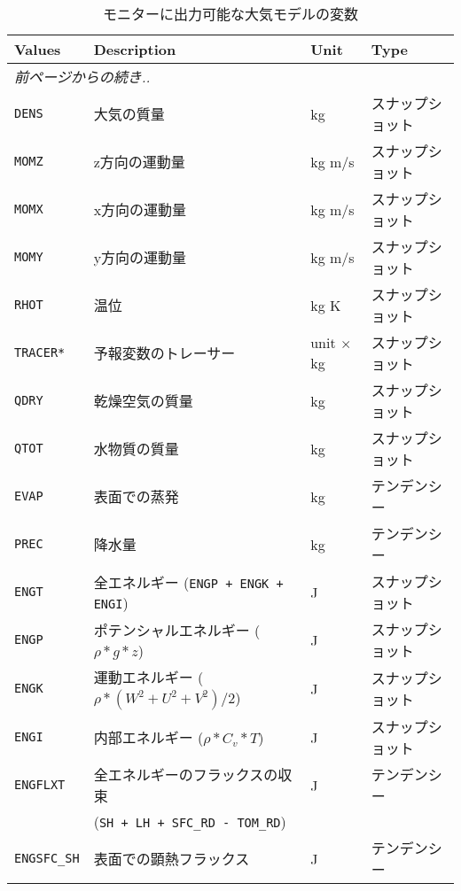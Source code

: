 \begin{longtable}{|l|l|l|l|}
  \caption{モニターに出力可能な大気モデルの変数}
  \label{tab:varlist_monitor_atmos} \\ \hline
  \rowcolor[gray]{0.9}  Values & Description & Unit & Type \\ \hline
  \endfirsthead
  \multicolumn{4}{l}{\small\it 前ページからの続き..} \\ \hline
  \endhead
  \hline
  \endfoot
      \verb|DENS|         & 大気の質量                      & kg     & スナップショット \\
      \verb|MOMZ|         & z方向の運動量                   & kg m/s & スナップショット \\
      \verb|MOMX|         & x方向の運動量                   & kg m/s & スナップショット \\
      \verb|MOMY|         & y方向の運動量                   & kg m/s & スナップショット \\
      \verb|RHOT|         & 温位                           & kg K   & スナップショット \\
      \verb|TRACER*|      & 予報変数のトレーサー             & unit $\times$ kg & スナップショット \\
      \verb|QDRY|         & 乾燥空気の質量                  & kg & スナップショット \\
      \verb|QTOT|         & 水物質の質量                    & kg & スナップショット \\
      \verb|EVAP|         & 表面での蒸発                    & kg & テンデンシー \\
      \verb|PREC|         & 降水量                         & kg & テンデンシー \\
      \verb|ENGT|         & 全エネルギー (\verb|ENGP + ENGK + ENGI|)   & J & スナップショット \\
      \verb|ENGP|         & ポテンシャルエネルギー ($\rho * g * z$)     & J & スナップショット \\
      \verb|ENGK|         & 運動エネルギー ($\rho * (W^2+U^2+V^2) / 2$) & J & スナップショット \\
      \verb|ENGI|         & 内部エネルギー ($\rho * C_v * T$)           & J & スナップショット \\
      \verb|ENGFLXT|      & 全エネルギーのフラックスの収束  & J & テンデンシー \\
                          & (\verb|SH + LH + SFC_RD - TOM_RD|) & & \\
      \verb|ENGSFC_SH|    & 表面での顕熱フラックス                & J & テンデンシー \\

\end{longtable}
